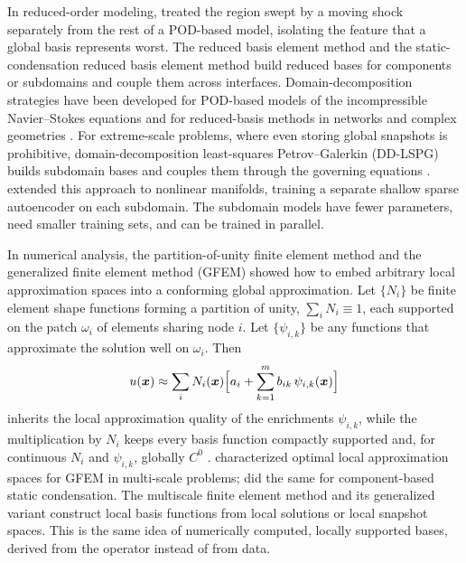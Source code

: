In reduced-order modeling, \textcite{lucia2001thesis,lucia2003moving} treated the region swept by
a moving shock separately from the rest of a POD-based model, isolating the
feature that a global basis represents worst. The reduced basis element method
\parencite{maday2002rbe} and the static-condensation reduced basis element
method \parencite{huynh2013scrbe} build reduced bases for components or
subdomains and couple them across interfaces. Domain-decomposition strategies
have been developed for POD-based models of the incompressible Navier--Stokes
equations \parencite{baiges2013dd} and for reduced-basis methods in networks
and complex geometries \parencite{iapichino2016dd}. For extreme-scale problems,
where even storing global snapshots is prohibitive, domain-decomposition
least-squares Petrov--Galerkin (DD-LSPG) builds subdomain bases and couples
them through the governing equations \parencite{hoang2021ddlspg}.
\textcite{diaz2024ddnm} extended this approach to nonlinear manifolds, training
a separate shallow sparse autoencoder on each subdomain. The subdomain models
have fewer parameters, need smaller training sets, and can be trained in
parallel.

In numerical analysis, the partition-of-unity finite element method
\parencite{melenk1996pum} and the generalized finite element method (GFEM)
\parencite{babuska2004gfem} showed how to embed arbitrary local approximation
spaces into a conforming global approximation. Let $\{N_i\}$ be finite element
shape functions forming a partition of unity, $\sum_i N_i\equiv 1$, each
supported on the patch $\omega_i$ of elements sharing node $i$. Let
$\{\psi_{i,k}\}$ be any functions that approximate the solution well on
$\omega_i$. Then
\begin{equation}
  u(\bm{x})\approx\sum_{i}N_i(\bm{x})\Bigl[a_i+\sum_{k=1}^{m}b_{ik}\,\psi_{i,k}(\bm{x})\Bigr]
  \label{eq:gfem}
\end{equation}
inherits the local approximation quality of the enrichments $\psi_{i,k}$, while
the multiplication by $N_i$ keeps every basis function compactly supported and,
for continuous $N_i$ and $\psi_{i,k}$, globally $C^{0}$
\parencite{melenk1996pum}. \textcite{babuska2011optimal} characterized optimal
local approximation spaces for GFEM in multi-scale problems;
\textcite{smetana2016optimal} did the same for component-based static
condensation. The multiscale finite element method
\parencite{hou1997msfem} and its generalized variant
\parencite{efendiev2013gmsfem} construct local basis functions from local
solutions or local snapshot spaces. This is the same idea of numerically
computed, locally supported bases, derived from the operator instead of from
data.

